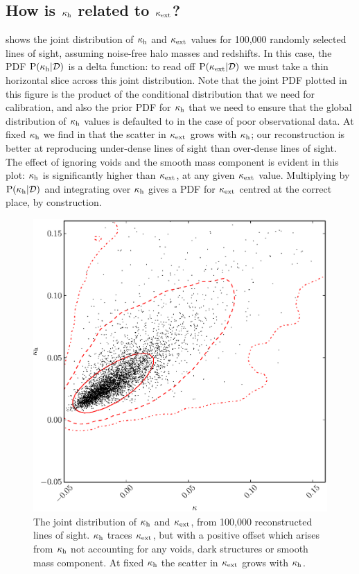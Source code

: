 \documentclass[useAMS,usenatbib]{mn2e}
\begin{document}
\subsection{How is $\kappa_{\rm h}$ related to $\kappa_{\rm ext}$?}

 shows the joint distribution of $\kappa_{\rm h}$ and $\kappa_{\rm ext}$
values for 100,000 randomly selected \MS lines of sight, assuming noise-free
halo masses and redshifts. In this case, the PDF ${\rm P}(\kappa_{\rm h}|{\mathcal{D}})$ is a
delta function: to read off ${\rm P}(\kappa_{\rm ext}|{\mathcal{D}})$ we must take a thin horizontal
slice across this joint distribution. Note that the joint PDF plotted in this
figure is the product of  the conditional distribution that we need for
calibration, and also the prior PDF for $\kappa_{\rm h}$ that we need to ensure that
the global distribution of $\kappa_{\rm h}$ values is defaulted to in the case of
poor observational data. At fixed $\kappa_{\rm h}$ we find in 
that the scatter in $\kappa_{\rm ext}$ grows with $\kappa_{\rm h}$; our reconstruction is
better at reproducing under-dense lines of sight than over-dense lines of sight.
The effect of ignoring voids and the smooth mass component is evident in this
plot: $\kappa_{\rm h}$ is significantly higher than $\kappa_{\rm ext}$, at any given $\kappa_{\rm ext}$
value. Multiplying by ${\rm P}(\kappa_{\rm h}|{\mathcal{D}})$ and integrating over $\kappa_{\rm h}$
gives a PDF for $\kappa_{\rm ext}$ centred at the correct place, by construction.

\begin{figure}
\includegraphics[width=\columnwidth]{figs/cornerplot.eps}
\caption[Biased?]{The joint distribution of 
$\kappa_{\rm h}$ and $\kappa_{\rm ext}$, from 100,000 reconstructed lines of
sight. $\kappa_{\rm h}$ traces $\kappa_{\rm ext}$, but with a positive offset which arises from
$\kappa_{\rm h}$ not accounting for any voids, dark structures or smooth mass
component. At fixed $\kappa_{\rm h}$ the scatter in $\kappa_{\rm ext}$ grows with $\kappa_{\rm h}$.}
\label{fig:jointkh-k}
\end{figure}
\end{document}
